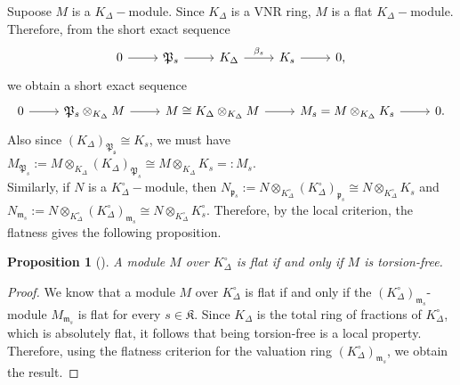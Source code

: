 \documentclass[12pts,a4paper]{amsart}
\newtheorem{proposition}{Proposition}[section]
\begin{document}
Supoose $M$ is a $K_\Delta-$module. Since $K_\Delta$ is a VNR ring, $M$ is a flat $K_\Delta-$module. Therefore, from the short exact sequence
\[
\begin{tikzcd}
    0\arrow[r] & \mathfrak{P}_s\arrow[r]&K_\Delta\arrow[r,"\beta_s"] & K_s\arrow[r] & 0,
\end{tikzcd}
\]
we obtain a short exact sequence
\[
\begin{tikzcd}
    0\arrow[r]& \mathfrak{P}_s\otimes_{K_\Delta} M\arrow[r] & M\cong K_\Delta\otimes_{K_\Delta} M\arrow[r]& M_s=M\otimes_{K_\Delta} K_s\arrow[r]&0.
\end{tikzcd}
\]
Also since $(K_\Delta)_{\mathfrak{P_s}}\cong K_s$, we must have $M_{\mathfrak{P}_s}:=M\otimes_{K_\Delta} (K_\Delta)_{\mathfrak{P}_s}\cong M\otimes_{K_\Delta}K_s=:M_s$.\\

Similarly, if $N$ is a $K^\circ_\Delta-$module, then $N_{\mathfrak{p}_s}:=N\otimes_{K^\circ_\Delta}(K^\circ_\Delta)_{\mathfrak{p}_s}\cong N\otimes_{K^\circ_\Delta}K_s$ and $N_{\mathfrak{m}_s}:=N\otimes_{K^\circ_\Delta}(K^\circ_\Delta)_{\mathfrak{m}_s}\cong N\otimes_{K^\circ_\Delta} K^\circ_s$. Therefore, by the local criterion, the flatness gives the following proposition.

\begin{proposition}[\label{Flatness criterion}]
	A module $M$ over $K^\circ_\Delta$ is flat if and only if $M$ is torsion-free.
\end{proposition}

\begin{proof}
 We know that a module $M$ over $K^\circ_\Delta$ is flat if and only if the $(K^\circ_\Delta)_{\mathfrak{m}_s}$-module $M_{\mathfrak{m}_s}$ is flat for every $s \in \mathfrak{K}$. Since $K_\Delta$ is the total ring of fractions of $K^\circ_\Delta$, which is absolutely flat, it follows that being torsion-free is a local property. Therefore, using the flatness criterion for the valuation ring $(K^\circ_\Delta)_{\mathfrak{m}_s}$, we obtain the result.
\end{proof}
\end{document}
